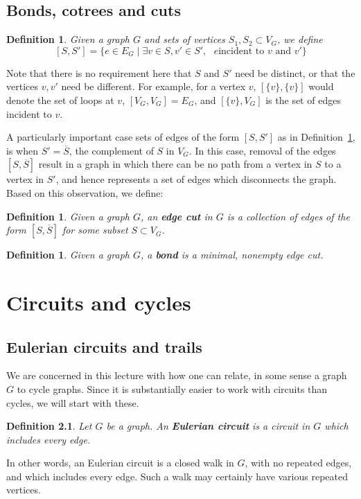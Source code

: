 \documentclass[12pt]{report}
\theoremstyle{plain}
\newtheorem{defn}[thm]{Definition}
\newcommand{\Xb}[1]{\textbf{#1}\index{#1}}
\begin{document}
\section{Bonds, cotrees and cuts}

\begin{defn} \label{def:edges between}
Given a graph $G$ and sets of vertices $S_1, S_2 \subset V_G$, we define
\[ [S, S'] = \{e \in E_G \mid \exists v \in S, v' \in S', \text{ $e$
incident to $v$ and $v'$}\}\]
\end{defn}
Note that there is no requirement here that $S$ and $S'$ need be distinct,
or that the vertices $v, v'$ need be different. For example, for a vertex
$v$, $[\{v\},\{v\}]$ would denote the set of loops at $v$, $[V_G, V_G]
= E_G$, and $[\{v\}, V_G]$ is the set of edges incident to $v$.

A particularly important case sets of edges of the form $[S, S']$ as in
Definition~\ref{def:edges between}, is when $S' = \overline S$, the
complement of $S$ in $V_G$. In this case, removal of the edges $[S,
\overline S]$ result in a graph in which there can be no path from a vertex
in $S$ to a vertex in $S'$, and hence represents a set of edges which
disconnects the graph. Based on this observation, we define:

\begin{defn} \label{def:edge cut}
Given a graph $G$, an \Xb{edge cut} in $G$ is a collection of edges of the
form $[S, \overline S]$ for some subset $S \subset V_G$.
\end{defn}

\begin{defn} \label{def:bond}
Given a graph $G$, a \Xb{bond} is a minimal, nonempty edge cut.
\end{defn}


\chapter{Circuits and cycles}

\section{Eulerian circuits and trails}

We are concerned in this lecture with how one can relate, in some sense a
graph $G$ to cycle graphs. Since it is substantially easier to work with
circuits than cycles, we will start with these.

\begin{defn}
Let $G$ be a graph. An \textbf{Eulerian circuit} is
a circuit in $G$ which includes every edge.
\end{defn}
In other words, an Eulerian circuit is a closed walk in $G$, with no
repeated edges, and which includes every edge. Such a walk may certainly
have various repeated vertices.
\end{document}
